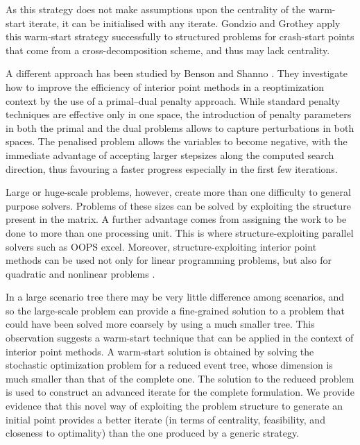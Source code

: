 As this strategy does not make assumptions upon the centrality of the 
warm-start iterate,
it can be initialised with any iterate.
Gondzio and Grothey \cite{GondzioGrothey03} apply this warm-start 
strategy successfully to structured problems for crash-start points that 
come from a cross-decomposition scheme, and thus may lack centrality.


A different approach has been studied by Benson and Shanno 
\cite{BensonShanno}. They investigate how to improve the efficiency 
of interior point methods in a reoptimization context by the use of 
a primal--dual penalty approach.
While standard penalty techniques are effective only in one space, 
the introduction of penalty parameters in both the primal and the 
dual problems allows to capture perturbations in both spaces.
%
%
The penalised problem allows the variables to become negative, with
the immediate advantage of accepting larger stepsizes along 
the computed search direction, thus favouring a faster progress
especially in the first few iterations.


\hrulefill


Large or huge-scale problems, however, create more than one difficulty 
to general purpose solvers. Problems of these sizes can be solved by 
exploiting the structure present in the matrix. A further advantage 
comes from assigning the work to be done to more than one processing unit. 
This is where structure-exploiting parallel solvers such as OOPS 
\cite{GondzioSarkissian} excel. Moreover, structure-exploiting interior 
point methods can be used not only for linear programming problems, 
but also for quadratic and nonlinear problems \cite{GondzioGrothey04}.

In a large scenario tree there may be very little difference among 
scenarios, and so the large-scale problem can provide a fine-grained 
solution to a problem that could have been solved more coarsely by 
using a much smaller tree. This observation suggests a
warm-start technique that can be applied in the context of interior 
point methods. A warm-start solution is obtained by solving the 
stochastic optimization problem for a reduced event tree, whose 
dimension is much smaller than that of the complete one. The solution 
to the reduced problem is used to construct an advanced iterate for 
the complete formulation. We provide evidence that this novel way 
of exploiting the problem structure to generate an initial point 
provides a better iterate (in terms of centrality, feasibility, 
and closeness to optimality) than the one produced by a generic 
strategy.


